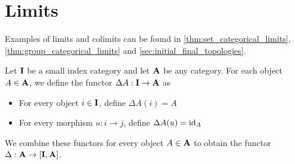 \section{Limits}\label{sec:categorical_limits}

\begin{note}\label{def:categorical_limit_examples}
  Examples of limits and colimits can be found in \cref{thm:set_categorical_limits}, \cref{thm:group_categorical_limits} and \cref{sec:initial_final_topologies}.
\end{note}

\begin{definition}\label{def:diagonal_functor}\cite[143]{Leinster2014}
  Let $\operatorname{\mathbf{I}}$ be a small index category and let $\operatorname{\mathbf{A}}$ be any category. For each object $A \in \operatorname{\mathbf{A}}$, we define the functor $\Delta A: \operatorname{\mathbf{I}} \to \operatorname{\mathbf{A}}$ as
  \begin{itemize}
    \item For every object $i \in \operatorname{\mathbf{I}}$, define $\Delta A(i) = A$
    \item For every morphism $u: i \to j$, define $\Delta A(u) = \operatorname{id}_A$
  \end{itemize}

  We combine these functors for every object $A \in \operatorname{\mathbf{A}}$ to obtain the functor $\Delta: \operatorname{\mathbf{A}} \to [\operatorname{\mathbf{I}}, \operatorname{\mathbf{A}}]$.
\end{definition}

